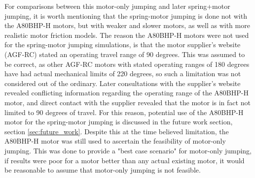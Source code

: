 For comparisons between this motor-only jumping and later spring+motor jumping, it is worth mentioning that the spring-motor jumping is done not with the A80BHP-H motors, but with weaker and slower motors, as well as with more realistic motor friction models. The reason the A80BHP-H motors were not used for the spring-motor jumping simulations, is that the motor supplier's website (AGF-RC) stated an operating travel range of 90 degrees. This was assumed to be correct, as other AGF-RC motors with stated operating ranges of 180 degrees have had actual mechanical limits of 220 degrees, so such a limitation was not considered out of the ordinary. Later consultations with the supplier's website revealed conflicting information regarding the operating range of the A80BHP-H motor, and direct contact with the supplier revealed that the motor is in fact not limited to 90 degrees of travel. For this reason, potential use of the A80BHP-H motor for the spring-motor jumping is discussed in the future work section, section \ref{sec:future_work}. Despite this at the time believed limitation, the A80BHP-H motor was still used to ascertain the feasibility of motor-only jumping. This was done to provide a "best case scenario" for motor-only jumping, if results were poor for a motor better than any actual existing motor, it would be reasonable to assume that motor-only jumping is not feasible.

